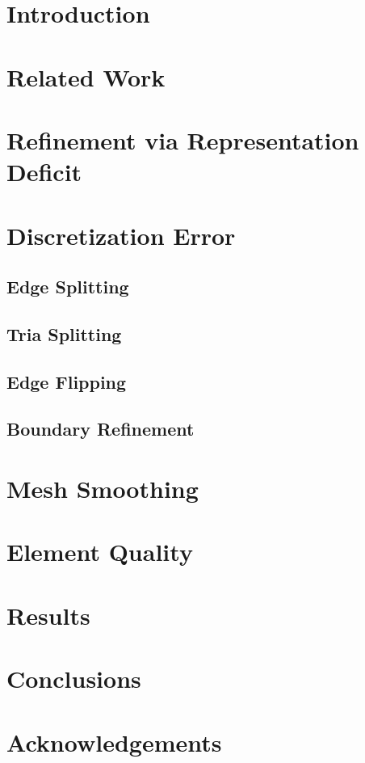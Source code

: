 \documentclass[11pt]{article}
\begin{document}
\section{Introduction}


\section{Related Work}

\section{Refinement via Representation Deficit}


\section{Discretization Error}


\subsection{Edge Splitting}


\subsection{Tria Splitting}


\subsection{Edge Flipping}


\subsection{Boundary Refinement}

\section{Mesh Smoothing}


\section{Element Quality}
\section{Results}
\section{Conclusions}
\section{Acknowledgements}
\end{document}
